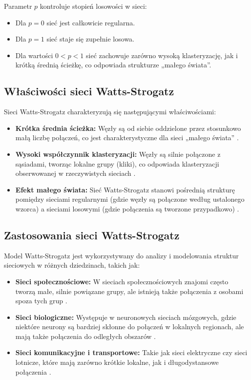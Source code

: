 Parametr $p$ kontroluje stopień losowości w sieci:
\begin{itemize}
    \item Dla $p = 0$ sieć jest całkowicie regularna.
    \item Dla $p = 1$ sieć staje się zupełnie losowa.
    \item Dla wartości $0 < p < 1$ sieć zachowuje zarówno wysoką klasteryzację, jak i krótką średnią ścieżkę, co odpowiada strukturze „małego świata”.
\end{itemize}

\subsection{Właściwości sieci Watts-Strogatz}
Sieci Watts-Strogatz charakteryzują się następującymi właściwościami:
\begin{itemize}
    \item \textbf{Krótka średnia ścieżka:} Węzły są od siebie oddzielone przez stosunkowo małą liczbę połączeń,
          co jest charakterystyczne dla sieci „małego świata” \cite{Watts1998}.
    \item \textbf{Wysoki współczynnik klasteryzacji:} Węzły są silnie połączone z sąsiadami, tworząc lokalne grupy (kliki),
          co odpowiada klasteryzacji obserwowanej w rzeczywistych sieciach \cite{Watts1998}.
    \item \textbf{Efekt małego świata:} Sieć Watts-Strogatz stanowi pośrednią strukturę pomiędzy sieciami regularnymi (gdzie węzły są połączone według ustalonego wzorca) a sieciami losowymi (gdzie połączenia są tworzone przypadkowo) \cite{Watts1998}.
\end{itemize}

\subsection{Zastosowania sieci Watts-Strogatz}
Model Watts-Strogatz jest wykorzystywany do analizy i modelowania struktur sieciowych w różnych dziedzinach, takich jak:
\begin{itemize}
    \item \textbf{Sieci społecznościowe:} W sieciach społecznościowych znajomi często tworzą małe, silnie powiązane grupy, ale istnieją także połączenia z osobami spoza tych grup \cite{Watts1998}.
    \item \textbf{Sieci biologiczne:} Występuje w neuronowych sieciach mózgowych, gdzie niektóre neurony są bardziej skłonne do połączeń w lokalnych regionach, ale mają także połączenia do odległych obszarów \cite{Sporns2004}.
    \item \textbf{Sieci komunikacyjne i transportowe:} Takie jak sieci elektryczne czy sieci lotnicze, które mają zarówno krótkie lokalne, jak i długodystansowe połączenia \cite{Barrat2004}.
\end{itemize}

